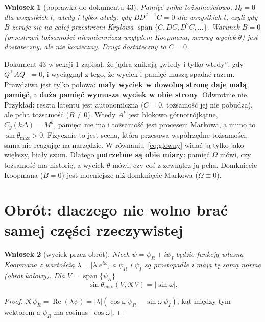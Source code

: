 \documentclass[11pt,a4paper]{article}
\newtheorem{wniosek}{Wniosek}
\theoremstyle{definition}
\theoremstyle{remark}
\newcommand{\Qp}{Q_{\perp}}
\newcommand{\T}{^{\top}}
\begin{document}
\begin{wniosek}[poprawka do dokumentu 43]\label{wn:poprawka}
Pamięć znika tożsamościowo, $\Omega_l = 0$ dla wszystkich $l$, wtedy i tylko wtedy, gdy
$B D^{\,l-1} C = 0$ dla wszystkich $l$, czyli gdy $B$ zeruje się na całej przestrzeni Kryłowa
$\operatorname{span}\{C, DC, D^2C,\dots\}$. Warunek $B=0$ (przestrzeń tożsamości niezmiennicza względem
Koopmana, zerowy wyciek $\theta$) jest dostateczny, ale \emph{nie} konieczny. Drugi dostateczny to $C=0$.
\end{wniosek}

Dokument 43 w sekcji 1 zapisał, że jądra znikają „wtedy i tylko wtedy”, gdy $Q\T A\Qp = 0$, i wyciągnął
z tego, że wyciek i pamięć muszą spadać razem. Prawdziwa jest tylko połowa: \textbf{mały wyciek w dowolną
stronę daje małą pamięć}, a \textbf{duża pamięć wymusza wyciek w obie strony}. Odwrotnie nie. Przykład:
reszta latentu jest autonomiczna ($C=0$, tożsamość jej nie pobudza), ale pcha tożsamość ($B\ne 0$).
Wtedy $A^k$ jest blokowo górnotrójkątne, $C_y(k\Delta) = M^k$, pamięci nie ma i tożsamość jest procesem
Markowa, a mimo to $\sin\theta_{\max}>0$. Fizycznie to jest scena, która przesuwa współrzędne tożsamości,
sama nie reagując na narzędzie. W równaniu~\eqref{eq:glowny} widać ją tylko jako większy, biały szum.
Dlatego \textbf{potrzebne są obie miary}: pamięć $\Omega$ mówi, czy tożsamość ma historię, a wyciek
$\theta$ mówi, czy coś z zewnątrz ją pcha. Domknięcie Koopmana ($B=0$) jest mocniejsze niż domknięcie Markowa
($\Omega\equiv 0$).

\section{Obrót: dlaczego nie wolno brać samej części rzeczywistej}

\begin{wniosek}[wyciek przez obrót]\label{wn:obrot}
Niech $\psi = \psi_R + i\psi_I$ będzie funkcją własną Koopmana z wartością $\lambda = |\lambda|e^{i\omega}$,
a $\psi_R$ i $\psi_I$ są prostopadłe i mają tę samą normę (obrót kołowy). Dla $V = \operatorname{span}\{\psi_R\}$
\[
\sin\theta_{\max}(V,\mathcal K V) = |\sin\omega| .
\]
\end{wniosek}

\begin{proof}
$\mathcal K\psi_R = \operatorname{Re}(\lambda\psi) = |\lambda|(\cos\omega\,\psi_R - \sin\omega\,\psi_I)$;
kąt między tym wektorem a $\psi_R$ ma cosinus $|\cos\omega|$.
\end{proof}
\end{document}
